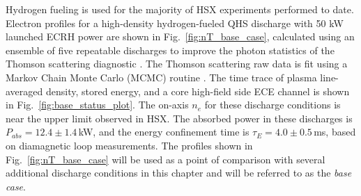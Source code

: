 \documentclass[%
 aip,
 amsmath,amssymb,
 reprint,%
]{revtex4-1}
\begin{document}
Hydrogen fueling is used for the majority of HSX experiments performed to date. Electron profiles for a high-density hydrogen-fueled QHS discharge with 50 kW launched ECRH power are shown in Fig.\ \ref{fig:nT_base_case}, calculated using an ensemble of five repeatable discharges to improve the photon statistics of the Thomson scattering diagnostic \cite{canik2007experimental,lore2010measurement}. The Thomson scattering raw data is fit using a Markov Chain Monte Carlo (MCMC) routine \cite{foreman2013emcee}. The time trace of plasma line-averaged density, stored energy, and a core high-field side ECE channel is shown in Fig.\ \ref{fig:base_status_plot}. The on-axis $n_e$ for these discharge conditions is near the upper limit observed in HSX. The absorbed power in these discharges is $P_{abs}=12.4 \pm 1.4$\,kW, and the energy confinement time is $\tau_E=4.0 \pm 0.5$\,ms, based on diamagnetic loop measurements. The profiles shown in Fig.\ \ref{fig:nT_base_case} will be used as a point of comparison with several additional discharge conditions in this chapter and will be referred to as the \textit{base case}.
\end{document}
